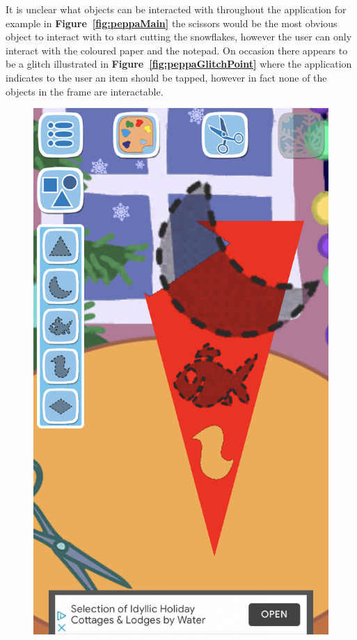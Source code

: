 \documentclass[11pt]{article}
\begin{document}
                    It is unclear what objects can be interacted with throughout the application for example in \textbf{Figure~\ref{fig:peppaMain}} the scissors would be the most obvious object to interact with to start cutting the snowflakes, however the user can only interact with the coloured paper and the notepad. On occasion there appears to be a glitch illustrated in \textbf{Figure~\ref{fig:peppaGlitchPoint}} where the application indicates to the user an item should be tapped, however in fact none of the objects in the frame are interactable. 
                    
                    \begin{figure}[!ht]
                        \begin{minipage}{0.32\textwidth}
                            \centering \includegraphics[width=0.8\linewidth]{Images/peppa/peppaShapes.PNG}

\end{minipage}
\end{figure}
\end{document}
